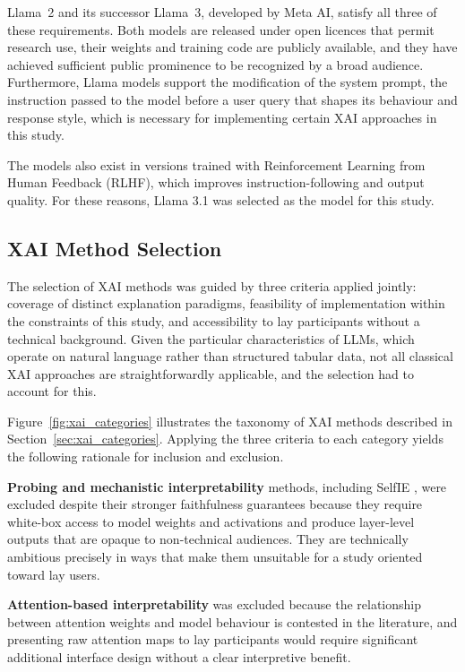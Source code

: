 Llama~2 and its successor Llama~3, developed by Meta AI, satisfy all three of these requirements. Both models are released under open licences that permit research use, their weights and training code are publicly available, and they have achieved sufficient public prominence to be recognized by a broad audience. Furthermore, Llama models support the modification of the system prompt, the instruction passed to the model before a user query that shapes its behaviour and response style, which is necessary for implementing certain XAI approaches in this study. 

The models also exist in versions trained with Reinforcement Learning from Human Feedback (RLHF), which improves instruction-following and output quality\cite{noauthor_llama_nodate}. For these reasons, Llama 3.1 was selected as the model for this study.

\subsection{XAI Method Selection}
The selection of XAI methods was guided by three criteria applied jointly: coverage of distinct explanation paradigms, feasibility of implementation within the constraints of this study, and accessibility to lay participants without a technical background. Given the particular characteristics of LLMs, which operate on natural language rather than structured tabular data, not all classical XAI approaches are straightforwardly applicable, and the selection had to account for this.

Figure~\ref{fig:xai_categories} illustrates the taxonomy of XAI methods described in Section~\ref{sec:xai_categories}. Applying the three criteria to each category yields the following rationale for inclusion and exclusion.

\textbf{Probing and mechanistic interpretability} methods, including SelfIE \cite{chen_selfie_2024}, were excluded despite their stronger faithfulness guarantees because they require white-box access to model weights and activations and produce layer-level outputs that are opaque to non-technical audiences. They are technically ambitious precisely in ways that make them unsuitable for a study oriented toward lay users.

\textbf{Attention-based interpretability} was excluded because the relationship between attention weights and model behaviour is contested in the literature, and presenting raw attention maps to lay participants would require significant additional interface design without a clear interpretive benefit.

